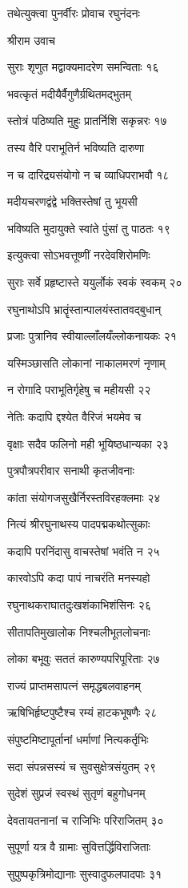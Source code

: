 तथेत्युक्त्वा पुनर्वीरः प्रोवाच रघुनंदनः

श्रीराम उवाच

सुराः शृणुत मद्वाक्यमादरेण समन्विताः १६

भवत्कृतं मदीयैर्वैगुणैर्ग्रथितमद्भुतम्

स्तोत्रं पठिष्यति मुहुः प्रातर्निशि सकृन्नरः १७

तस्य वैरि पराभूतिर्न भविष्यति दारुणा

न च दारिद्र्यसंयोगो न च व्याधिपराभवौ १८

मदीयचरणद्वंद्वे भक्तिस्तेषां तु भूयसी

भविष्यति मुदायुक्ते स्वांते पुंसां तु पाठतः १९

इत्युक्त्वा सोऽभवत्तूष्णीं नरदेवशिरोमणिः

सुराः सर्वे प्रहृष्टास्ते ययुर्लोकं स्वकं स्वकम् २०

रघुनाथोऽपि भ्रातॄंस्तान्पालयंस्तातवद्बुधान्

प्रजाः पुत्रानिव स्वीयाल्लाँलयँल्लोकनायकः २१

यस्मिञ्छासति लोकानां नाकालमरणं नृणाम्

न रोगादि पराभूतिर्गृहेषु च महीयसी २२

नेतिः कदापि द्दश्येत वैरिजं भयमेव च

वृक्षाः सदैव फलिनो मही भूयिष्ठधान्यका २३

पुत्रपौत्रपरीवार सनाथी कृतजीवनाः

कांता संयोगजसुखैर्निरस्तविरहक्लमाः २४

नित्यं श्रीरघुनाथस्य पादपद्मकथोत्सुकाः

कदापि परनिंदासु वाचस्तेषां भवंति न २५

कारवोऽपि कदा पापं नाचरंति मनस्यहो

रघुनाथकराघातदुःखशंकाभिशंसिनः २६

सीतापतिमुखालोक निश्चलीभूतलोचनाः

लोका बभूवुः सततं कारुण्यपरिपूरिताः २७

राज्यं प्राप्तमसापत्नं समृद्धबलवाहनम्

ऋषिभिर्हृष्टपुष्टैश्च रम्यं हाटकभूषणैः २८

संपुष्टमिष्टापूर्तानां धर्माणां नित्यकर्तृभिः

सदा संपन्नसस्यं च सुवसुक्षेत्रसंयुतम् २९

सुदेशं सुप्रजं स्वस्थं सुतृणं बहुगोधनम्

देवतायतनानां च राजिभिः परिराजितम् ३०

सुपूर्णा यत्र वै ग्रामाः सुवित्तर्द्धिविराजिताः

सुपुष्पकृत्रिमोद्यानाः सुस्वादुफलपादपाः ३१

